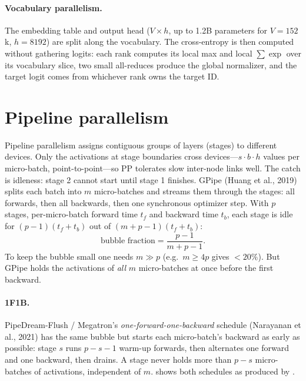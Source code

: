 \paragraph{Vocabulary parallelism.} The embedding table and output head ($V\times h$, up to
1.2B parameters for $V=152$k, $h=8192$) are split along the vocabulary. The cross-entropy is then
computed without gathering logits: each rank computes its local max and local
$\sum\exp$ over its vocabulary slice, two small all-reduces produce the global normalizer, and
the target logit comes from whichever rank owns the target ID.

\section{Pipeline parallelism}\label{sec:dist:pp}

Pipeline parallelism assigns contiguous groups of layers (stages) to different devices. Only
the activations at stage boundaries cross devices---$s\cdot b\cdot h$ values per micro-batch,
point-to-point---so PP tolerates slow inter-node links well. The catch is idleness: stage 2
cannot start until stage 1 finishes. GPipe (Huang et al., 2019) splits each batch into $m$
micro-batches and streams them through the stages: all forwards, then all backwards, then one
synchronous optimizer step. With $p$ stages, per-micro-batch forward time $t_f$ and backward
time $t_b$, each stage is idle for $(p-1)(t_f+t_b)$ out of $(m+p-1)(t_f+t_b)$:
\begin{equation}
\text{bubble fraction} = \frac{p-1}{m+p-1}.
\label{eq:dist:bubble}
\end{equation}
To keep the bubble small one needs $m\gg p$ (e.g.\ $m\ge4p$ gives $<20\%$). But GPipe holds the
activations of \emph{all} $m$ micro-batches at once before the first backward.

\paragraph{1F1B.} PipeDream-Flush / Megatron's \emph{one-forward-one-backward} schedule (Narayanan
et al., 2021) has the same bubble but starts each micro-batch's backward as early as possible:
stage $s$ runs $p-s-1$ warm-up forwards, then alternates one forward and one backward, then
drains. A stage never holds more than $p-s$ micro-batches of activations, independent of $m$.
 shows both schedules as produced by .

